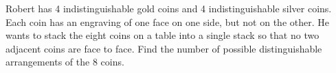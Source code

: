 Robert has 4 indistinguishable gold coins and 4 indistinguishable silver coins. Each coin has an engraving of one face on one side, but not on the other. He wants to stack the eight coins on a table into a single stack so that no two adjacent coins are face to face. Find the number of possible distinguishable arrangements of the 8 coins.